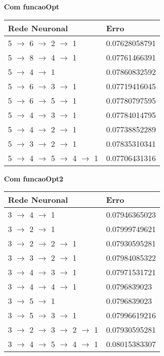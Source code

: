 \documentclass{article}
\begin{document}
\textbf{Com funcaoOpt}
\begin{center}
\begin{tabular}{ | l | l | }
\hline
Rede Neuronal & Erro\\ \hline
5 $\to$ 6 $\to$ 2 $\to$ 1 & 0.07628058791\\ \hline
5 $\to$ 8 $\to$ 4 $\to$ 1 & 0.07761466391\\ \hline
5 $\to$ 4 $\to$ 1 & 0.07860832592\\ \hline
5 $\to$ 6 $\to$ 3 $\to$ 1 & 0.07719416045\\ \hline
5 $\to$ 6 $\to$ 5 $\to$ 1 & 0.07780797595\\ \hline
5 $\to$ 4 $\to$ 3 $\to$ 1 & 0.07784014795\\ \hline
5 $\to$ 4 $\to$ 2 $\to$ 1 & 0.07738852289\\ \hline
5 $\to$ 3 $\to$ 2 $\to$ 1 & 0.07835310341\\ \hline
5 $\to$ 4 $\to$ 5 $\to$ 4 $\to$ 1 & 0.07706431316\\ \hline
\end{tabular}
\end{center}

\textbf{Com funcaoOpt2}
\begin{center}
\begin{tabular}{ | l | l | }
\hline
Rede Neuronal & Erro\\ \hline
3 $\to$ 4 $\to$ 1 & 0.07946365023\\ \hline
3 $\to$ 2 $\to$ 1 & 0.07999749621\\ \hline
3 $\to$ 2 $\to$ 2 $\to$ 1 & 0.07930595281\\ \hline
3 $\to$ 3 $\to$ 2 $\to$ 1 & 0.07984085322\\ \hline
3 $\to$ 4 $\to$ 3 $\to$ 1 & 0.07971531721\\ \hline
3 $\to$ 4 $\to$ 4 $\to$ 1 & 0.0796839023\\ \hline
3 $\to$ 5 $\to$ 1 & 0.0796839023\\ \hline
3 $\to$ 5 $\to$ 3 $\to$ 1 & 0.07996619216\\ \hline
3 $\to$ 2 $\to$ 3 $\to$ 2 $\to$ 1 & 0.07930595281\\ \hline
3 $\to$ 4 $\to$ 5 $\to$ 4 $\to$ 1 & 0.08015383307\\ \hline
\end{tabular}
\end{center}
\end{document}
